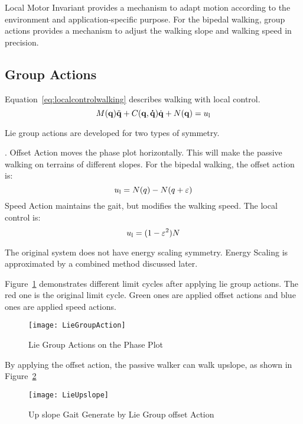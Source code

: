 Local Motor Invariant provides a mechanism to adapt motion according to the environment and application-specific purpose. 
For the bipedal walking, group actions provides a mechanism to adjust the walking slope and walking speed in precision.




\subsection{Group Actions}

Equation~\ref{eq:localcontrolwalking} describes walking with local control.
\begin{equation}
\label{eq:localcontrolwalking}
M(\mathbf{q}) \ddot{\mathbf{q}} + C(\mathbf{q,\dot{q}})\dot{\mathbf{q}} + N(\mathbf{q}) = u_{\mathrm{l}}
\end{equation}




Lie group actions are developed for two types of symmetry.
\begin{itemize}

.
Offset Action moves the phase plot horizontally.
This will make the passive walking on terrains of different slopes.
For the bipedal walking, the offset action is:
\[
u_{\mathrm{l}}=N(q)-N(q+\varepsilon)
\]
Speed Action maintains the gait, but modifies the walking speed.
The local control is:
\[  
u_{\mathrm{l}}=(1-\varepsilon^2)N
\]
\end{itemize}

The original system does not have energy scaling symmetry.
Energy Scaling is approximated by a combined method discussed later.

Figure~\ref{fig:walkliegroupphase} demonstrates different limit cycles after applying lie group actions.
The red one is the original limit cycle.
Green ones are applied offset actions and blue ones are applied speed actions.


\begin{figure}[!htbp]
  \begin{center}
     \texttt{[image: LieGroupAction]}
    \caption{Lie Group Actions on the Phase Plot}
    \label{fig:walkliegroupphase}
\end{center}
\end{figure}


By applying the offset action,   the passive walker can walk upslope, as shown in Figure~\ref{fig:liegroupupslope}
\begin{figure}[!htbp]
  \begin{center}
      \texttt{[image: LieUpslope]}
    \caption{Up slope Gait Generate by Lie Group offset Action}
    \label{fig:liegroupupslope}
\end{center}
\end{figure}

